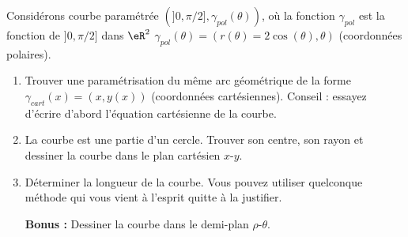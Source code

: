 \begin{exercice}\label{exoDS2011-0004}

Considérons  courbe paramétrée $(]0,\pi/2], \gamma_{pol}(\theta))$, où la fonction $\gamma_{pol}$ est la fonction de $]0,\pi/2]$ dans $\eR^2$  $\gamma_{pol}(\theta)=(r(\theta)=2\cos(\theta), \theta)$ (coordonnées polaires).
\begin{enumerate}
\item Trouver une paramétrisation du même arc géométrique de la forme $\gamma_{cart}(x)=(x, y(x))$ (coordonnées cartésiennes). Conseil : essayez d'écrire d'abord l'équation cartésienne de la courbe.
\item La courbe est une partie d'un cercle. Trouver son centre, son rayon et dessiner la courbe dans le plan cartésien $x$-$y$. 
\item Déterminer la longueur de la courbe. Vous pouvez utiliser quelconque méthode qui vous vient à l'esprit quitte à la justifier.
\item[\textbf{Bonus :}] Dessiner la courbe dans le demi-plan $\rho$-$\theta$.    
\end{enumerate}
\end{exercice}
